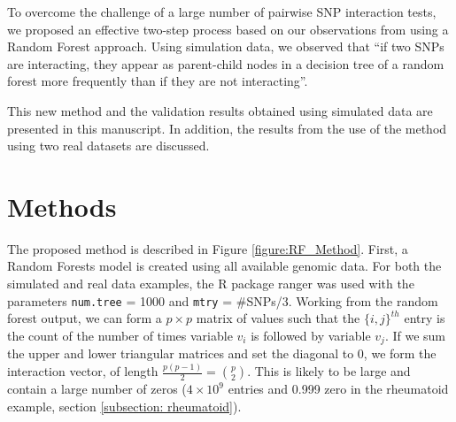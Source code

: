 \documentclass[authoryear,preprint,12pt,3p]{elsarticle}
\begin{document}
To overcome the challenge of a large number of pairwise SNP interaction tests, we proposed an effective two-step process
based on our observations from using a Random Forest approach. Using simulation data, we observed that ``if two SNPs are
interacting, they appear as parent-child nodes in a decision tree of a random forest more frequently than if they are
not interacting''.


This new method and the validation results obtained using simulated data are presented in this manuscript. In
addition, the results from the use of the method using two real datasets are discussed.


\section{Methods}

The proposed method is described in Figure \ref{figure:RF_Method}. First, a Random Forests model is created using all
available genomic data. For both the simulated and real data examples, the R package ranger
\cite[]{Wright.and.Ziegler.2017} was used with the parameters \texttt{num.tree} = 1000 and \texttt{mtry} = \#SNPs/3.
Working from the random forest output, we can form a $p \times p$ matrix of values such that the $\{i,j\}^{th}$ entry is the count of the
number of times variable $v_i$ is followed by variable $v_j$.  If we sum the upper and lower triangular matrices and set the diagonal to 0,
we form the interaction vector, of length $\frac {p(p-1)} 2 = {p \choose 2}$.  This is likely to be large and contain a large number of
zeros ($4 \times 10^9$ entries and 0.999 zero in the rheumatoid example, section \ref{subsection: rheumatoid}).
\end{document}
